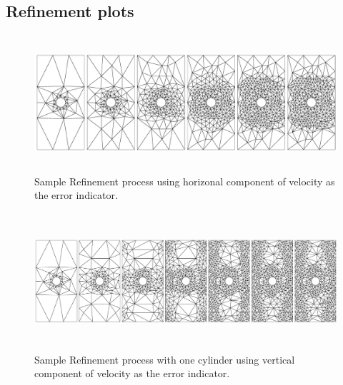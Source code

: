 \documentclass[wrr]{agutex}  %
\begin{document}
\begin{article}

\vfill

\newpage
\appendix 
\section{Refinement plots}
 \newcommand{\w}{6.1pc}
 \newcommand{\h}{12pc}
%
%
\begin{figure}[h]
\includegraphics[height=\h]{../plots/u_1_row.pdf}
\caption{Sample Refinement process using horizonal component of velocity as the error indicator.}   \label{fig:refine_u1}
\end{figure}

\setcounter{subfigure}{0}
\begin{figure}[h]
\includegraphics[height=\h]{../plots/v_1_row.pdf}
\caption{Sample Refinement process with one cylinder using vertical component of velocity as the error indicator.}   \label{fig:refine_v1}
\end{figure}


\end{article}
\end{document}
